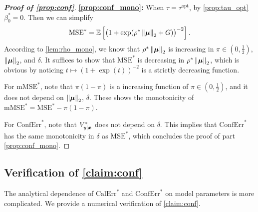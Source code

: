 \begin{proof}[\textbf{Proof of \cref{prop:conf}}]
\vspace{0.5\baselineskip}
\noindent
\textbf{\ref{prop:conf_mono}:}
When $\tau = \tau^\mathrm{opt}$, by \cref{prop:tau_opt} $\beta_0^* = 0$. Then we can simplify
    \begin{equation*}
            \mathrm{MSE}^* =  \mathbb{E}\left[ \bigl(  1 + \exp( \rho^* \left\|{\text{\boldmath $\mu$}}\right\|_2 + G) \bigr)^{-2} \right] .
    \end{equation*}
    According to \cref{lem:rho_mono}, we know that $\rho^* \left\|{\text{\boldmath $\mu$}}\right\|_2$ is increasing in $\pi \in (0, \frac12)$, $\left\|{\text{\boldmath $\mu$}}\right\|_2$, and $\delta$. It suffices to show that $\mathrm{MSE}^*$ is decreasing in $\rho^* \left\|{\text{\boldmath $\mu$}}\right\|_2$, which is obvious by noticing $t \mapsto ( 1 + \exp(t) )^{-2}$ is a strictly decreasing function.

    For $\mathrm{mMSE}^*$, note that $\pi(1 - \pi)$ is a increasing function of $\pi \in (0, \frac12)$, and it does not depend on $\left\|{\text{\boldmath $\mu$}}\right\|_2$, $\delta$. These shows the monotonicity of $\mathrm{mMSE}^* = \mathrm{MSE}^* - \pi(1 - \pi)$.

    For $\mathrm{ConfErr}^*$, note that $V_{y|\text{\boldmath $x$}}^*$ does not depend on $\delta$. This implies that $\mathrm{ConfErr}^*$ has the same monotonicity in $\delta$ as $\mathrm{MSE}^*$, which concludes the proof of part \ref{prop:conf_mono}.
\end{proof}



\subsection{Verification of \cref{claim:conf}}

The analytical dependence of $\mathrm{CalErr}^*$ and $\mathrm{ConfErr}^*$ on model parameters is more complicated. We provide a numerical verification of \cref{claim:conf}.

